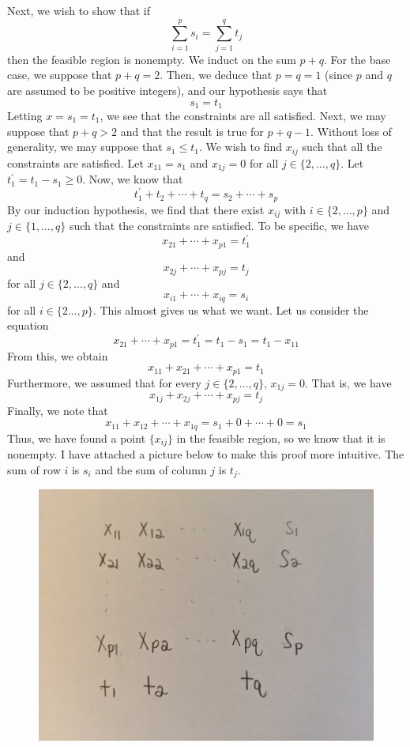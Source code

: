 \documentclass[12pt]{article}
\begin{document}
Next, we wish to show that if 
\[
\sum_{i=1}^p s_i = \sum_{j=1}^q t_j
\] then the feasible region is nonempty. We induct on the sum $p+q$. For the base case, we suppose that $p+q = 2$. Then, we deduce that $p = q =1$ (since $p$ and $q$ are assumed to be positive integers), and our hypothesis says that
\[
s_1 = t_1
\] Letting $x = s_1 = t_1$, we see that the constraints are all satisfied. Next, we may suppose that $p+q > 2$ and that the result is true for $p+q-1$. Without loss of generality, we may suppose that $s_1 \leq t_1$. We wish to find $x_{ij}$ such that all the constraints are satisfied. Let $x_{11} = s_{1}$ and $x_{1j} = 0$ for all $j \in \{2,\ldots,q\}$. Let $t_1^\prime = t_1 - s_1 \geq 0$. Now, we know that
\[
t_1^\prime + t_2 + \cdots + t_q  = s_2 + \cdots + s_p
\] By our induction hypothesis, we find that there exist $x_{ij}$ with $i \in \{2,\ldots,p\}$ and $j \in \{1,\ldots,q\}$ such that the constraints are satisfied. To be specific, we have
\[
x_{21} + \cdots + x_{p1} = t_1^\prime
\] and
\[
x_{2j} + \cdots + x_{pj} = t_j
\] for all $j \in \{2,\ldots,q\}$ and
\[
x_{i1} + \cdots + x_{iq} = s_i
\] for all $i \in \{2\ldots,p\}$. This almost gives us what we want. Let us consider the equation
\[
x_{21} + \cdots + x_{p1} = t_1^\prime = t_1 - s_1 = t_1 - x_{11}
\] From this, we obtain
\[
x_{11} + x_{21} + \cdots + x_{p1} = t_1
\] Furthermore, we assumed that for every $j \in \{2,\ldots,q\}$, $x_{1j} = 0$. That is, we have
\[
x_{1j} + x_{2j} + \cdots + x_{pj} = t_j
\] Finally, we note that
\[
x_{11} + x_{12} + \cdots + x_{1q} = s_1 + 0 + \cdots + 0 = s_1
\] Thus, we have found a point $\{x_{ij}\}$ in the feasible region, so we know that it is nonempty. I have attached a picture below to make this proof more intuitive. The sum of row $i$ is $s_i$ and the sum of column $j$ is $t_j$.
\begin{figure}[H]
\centering
\includegraphics[width=\textwidth]{pic1}
\end{figure}
\newpage
\end{document}
